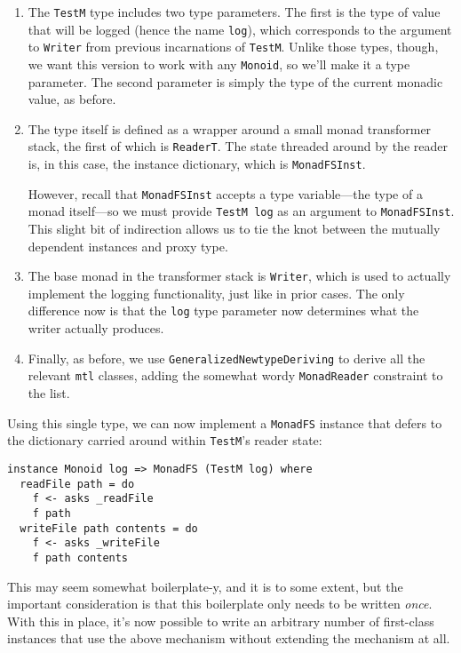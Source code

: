 \begin{enumerate}
\item
  The \texttt{TestM} type includes two type parameters. The first is the
  type of value that will be logged (hence the name \texttt{log}), which
  corresponds to the argument to \texttt{Writer} from previous
  incarnations of \texttt{TestM}. Unlike those types, though, we want
  this version to work with any \texttt{Monoid}, so we'll make it a type
  parameter. The second parameter is simply the type of the current
  monadic value, as before.
\item
  The type itself is defined as a wrapper around a small monad
  transformer stack, the first of which is \texttt{ReaderT}. The state
  threaded around by the reader is, in this case, the instance
  dictionary, which is \texttt{MonadFSInst}.

  However, recall that \texttt{MonadFSInst} accepts a type
  variable---the type of a monad itself---so we must provide
  \texttt{TestM\ log} as an argument to \texttt{MonadFSInst}. This
  slight bit of indirection allows us to tie the knot between the
  mutually dependent instances and proxy type.
\item
  The base monad in the transformer stack is \texttt{Writer}, which is
  used to actually implement the logging functionality, just like in
  prior cases. The only difference now is that the \texttt{log} type
  parameter now determines what the writer actually produces.
\item
  Finally, as before, we use \texttt{GeneralizedNewtypeDeriving} to
  derive all the relevant \texttt{mtl} classes, adding the somewhat
  wordy \texttt{MonadReader} constraint to the list.
\end{enumerate}
Using this single type, we can now implement a \texttt{MonadFS} instance
that defers to the dictionary carried around within \texttt{TestM}'s
reader state:

\begin{verbatim}
instance Monoid log => MonadFS (TestM log) where
  readFile path = do
    f <- asks _readFile
    f path
  writeFile path contents = do
    f <- asks _writeFile
    f path contents
\end{verbatim}
This may seem somewhat boilerplate-y, and it is to some extent, but the
important consideration is that this boilerplate only needs to be
written \emph{once}. With this in place, it's now possible to write an
arbitrary number of first-class instances that use the above mechanism
without extending the mechanism at all.

